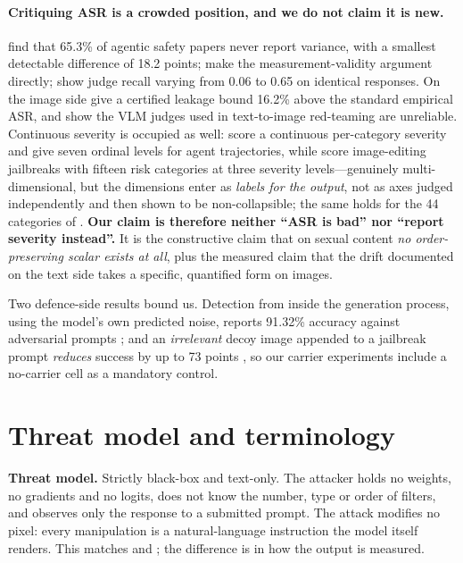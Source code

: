 \documentclass[11pt]{article}
\begin{document}
\paragraph{Critiquing ASR is a crowded position, and we do not claim it is new.}
\citet{asrisnotanumber} find that 65.3\% of agentic safety papers never report
variance, with a smallest detectable difference of 18.2 points;
\citet{comparisonrequires} make the measurement-validity argument directly;
\citet{judgecalib} show judge recall varying from 0.06 to 0.65 on identical
responses. On the image side \citet{certifyingunlearning} give a certified leakage
bound 16.2\% above the standard empirical ASR, and \citet{rise} show the VLM judges
used in text-to-image red-teaming are unreliable. Continuous severity is occupied
as well: \citet{past2harm} score a continuous per-category severity and
\citet{actiongraded} give seven ordinal levels for agent trajectories, while
\citet{visualjailbreak} score image-editing jailbreaks with fifteen risk categories
at three severity levels---genuinely multi-dimensional, but the dimensions enter as
\emph{labels for the output}, not as axes judged independently and then shown to be
non-collapsible; the same holds for the 44 categories of \citet{t2isafety}.
\textbf{Our claim is therefore neither ``ASR is bad'' nor ``report severity
instead''.} It is the constructive claim that on sexual content \emph{no
order-preserving scalar exists at all}, plus the measured claim that the drift
documented on the text side takes a specific, quantified form on images.

Two defence-side results bound us. Detection from inside the generation process,
using the model's own predicted noise, reports 91.32\% accuracy against
adversarial prompts \citep{igndetector,unindm}; and an \emph{irrelevant} decoy
image appended to a jailbreak prompt \emph{reduces} success by up to 73 points
\citep{decoydrops}, so our carrier experiments include a no-carrier cell as a
mandatory control.
\section{Threat model and terminology}
\label{sec:scope}

\textbf{Threat model.} Strictly black-box and text-only. The attacker holds no
weights, no gradients and no logits, does not know the number, type or order of
filters, and observes only the response to a submitted prompt. The attack
modifies no pixel: every manipulation is a natural-language instruction the model
itself renders. This matches \citet{crack} and \citet{janus}; the difference is
in how the output is measured.
\end{document}
